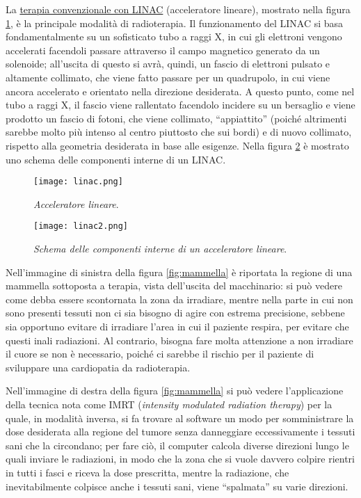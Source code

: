 \documentclass{report}
\newcommand{\virgolette}[1]{``#1''}
\newcommand{\figref}[1]{figura \ref{#1}}
\numberwithin{equation}{section}
\numberwithin{figure}{section}
\begin{document}
La \underline{terapia convenzionale con LINAC} (acceleratore lineare), mostrato nella \figref{fig:linac}, è la principale modalità di radioterapia. Il funzionamento del LINAC si basa fondamentalmente su un sofisticato tubo a raggi X, in cui gli elettroni vengono accelerati facendoli passare attraverso il campo magnetico generato da un solenoide; all'uscita di questo si avrà, quindi, un fascio di elettroni pulsato e altamente collimato, che viene fatto passare per un quadrupolo, in cui viene ancora accelerato e orientato nella direzione desiderata. A questo punto, come nel tubo a raggi X, il fascio viene rallentato facendolo incidere su un bersaglio e viene prodotto un fascio di fotoni, che viene collimato, \virgolette{appiattito} (poiché altrimenti sarebbe molto più intenso al centro piuttosto che sui bordi) e di nuovo collimato, rispetto alla geometria desiderata in base alle esigenze. Nella \figref{fig:linac2} è mostrato uno schema delle componenti interne di un LINAC.

\begin{figure}[htp]
\centering
\texttt{[image: linac.png]}
\caption{\label{fig:linac} \textit{Acceleratore lineare}.}
\end{figure}

\begin{figure}[H]
\centering
\texttt{[image: linac2.png]}
\caption{\label{fig:linac2} \textit{Schema delle componenti interne di un acceleratore lineare}.}
\end{figure}

Nell'immagine di sinistra della \figref{fig:mammella} è riportata la regione di una mammella sottoposta a terapia, vista dell'uscita del macchinario: si può vedere come debba essere scontornata la zona da irradiare, mentre nella parte in cui non sono presenti tessuti non ci sia bisogno di agire con estrema precisione, sebbene sia opportuno evitare di irradiare l'area in cui il paziente respira, per evitare che questi inali radiazioni. Al contrario, bisogna fare molta attenzione a non irradiare il cuore se non è necessario, poiché ci sarebbe il rischio per il paziente di sviluppare una cardiopatia da radioterapia.

Nell'immagine di destra della \figref{fig:mammella} si può vedere l'applicazione della tecnica nota come IMRT (\textit{intensity modulated radiation therapy}) per la quale, in modalità inversa, si fa trovare al software un modo per somministrare la dose desiderata alla regione del tumore senza danneggiare eccessivamente i tessuti sani che la circondano; per fare ciò, il computer calcola diverse direzioni lungo le quali inviare le radiazioni, in modo che la zona che si vuole davvero colpire rientri in tutti i fasci e riceva la dose prescritta, mentre la radiazione, che inevitabilmente colpisce anche i tessuti sani, viene \virgolette{spalmata} su varie direzioni.
\end{document}
